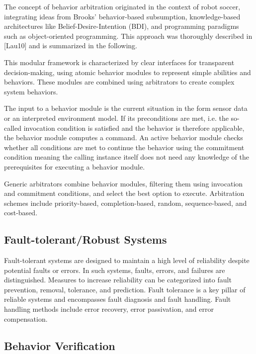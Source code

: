 The concept of behavior arbitration originated in the context of robot soccer, integrating ideas from Brooks' behavior-based subsumption, knowledge-based architectures like Belief-Desire-Intention (BDI), and programming paradigms such as object-oriented programming.
This approach was thoroughly described in [Lau10] and is summarized in the following.

This modular framework is characterized by clear interfaces for transparent decision-making, using atomic behavior modules to represent simple abilities and behaviors.
These modules are combined using arbitrators to create complex system behaviors.

The input to a behavior module is the current situation in the form sensor data or an interpreted environment model.
If its preconditions are met, i.e. the so-called invocation condition is satisfied and the behavior is therefore applicable, the behavior module computes a command.
An active behavior module checks whether all conditions are met to continue the behavior using the commitment condition meaning the calling instance itself does not need any knowledge of the prerequisites for executing a behavior module.

Generic arbitrators combine behavior modules, filtering them using invocation and commitment conditions, and select the best option to execute.
Arbitration schemes include priority-based, completion-based, random, sequence-based, and cost-based.

\subsection{Fault-tolerant/Robust Systems}

Fault-tolerant systems are designed to maintain a high level of reliability despite potential faults or errors.
In such systems, faults, errors, and failures are distinguished.
Measures to increase reliability can be categorized into fault prevention, removal, tolerance, and prediction.
Fault tolerance is a key pillar of reliable systems and encompasses fault diagnosis and fault handling.
Fault handling methods include error recovery, error passivation, and error compensation.

\subsection{Behavior Verification}


